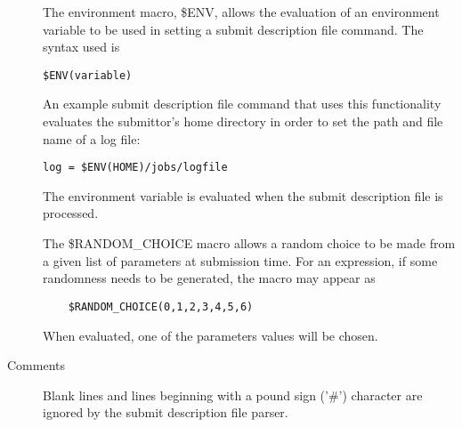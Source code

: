 \begin{description}
The environment macro, \$ENV, allows the evaluation of an environment
variable to be used in setting a submit description file command.
The syntax used is
\begin{verbatim} 
$ENV(variable)
\end{verbatim}
An example submit description file command that uses this functionality
evaluates the submittor's home directory in order to set the
path and file name of a log file:
\begin{verbatim} 
log = $ENV(HOME)/jobs/logfile
\end{verbatim}
The environment variable is evaluated when the submit description
file is processed.

The \$RANDOM\_CHOICE macro allows a random choice to be made
from a given list of parameters at submission time.
For an expression, if some randomness needs to be generated,
the macro may appear as
\begin{verbatim} 
    $RANDOM_CHOICE(0,1,2,3,4,5,6)
\end{verbatim}
When evaluated, one of the parameters values will be chosen. 

\item[Comments] Blank lines and lines beginning with a 
pound sign
('\#')
character are ignored by the submit description file parser. 

\end{description}

